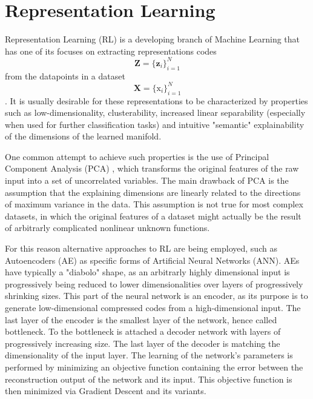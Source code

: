 \section{Representation Learning}
Representation Learning (RL) is a developing branch of Machine Learning that has one of its
focuses on extracting representations codes $$\mathbf{Z} = \{\mathbf{z}_i\}_{i=1}^N$$ from the datapoints in a dataset $$\mathbf{X} = \{\mathrm{x}_i\}_{i=1}^N$$.
It is usually desirable for these representations to be characterized by properties such as low-dimensionality, clusterability, increased linear separability (especially when used for further classification tasks) and intuitive "semantic" explainability of the dimensions of the learned manifold.

One common attempt to achieve such properties is the use of Principal Component Analysis (PCA) , which transforms the original features of the raw input into a set of uncorrelated variables.
The main drawback of PCA is the assumption that the explaining dimensions are linearly related to the directions of maximum variance in the data.
This assumption is not true for most complex datasets, in which the original features of a dataset might actually be the result of arbitrarly complicated nonlinear unknown functions.

For this reason alternative approaches to RL are being employed, such as Autoencoders (AE) as specific forms of Artificial Neural Networks (ANN).
AEs have typically a "diabolo" shape, as an arbitrarly highly dimensional input is progressively being reduced to lower dimensionalities over layers of progressively shrinking sizes.
This part of the neural network is an encoder, as its purpose is to generate low-dimensional compressed codes from a high-dimensional input.
The last layer of the encoder is the smallest layer of the network, hence called bottleneck.
To the bottleneck is attached a decoder network with layers of progressively increasing size.
The last layer of the decoder is matching the dimensionality of the input layer.
The learning of the network's parameters is performed by minimizing an objective function containing the error between the reconstruction output of the network and its input.
This objective function is then minimized via Gradient Descent and its variants.
